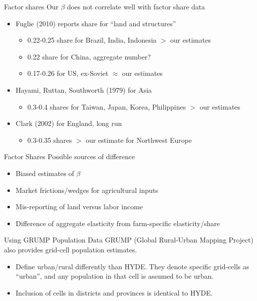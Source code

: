 \documentclass[10pt, xcolor=dvipsnames]{beamer}
\begin{document}
\begin{frame}{Factor shares}\label{shares}
Our $\beta$ does not correlate well with factor share data
\begin{itemize}
  \item Fuglie (2010) reports share for ``land and structures''
  \begin{itemize}
    \item 0.22-0.25 share for Brazil, India, Indonesia $>$ our estimates
    \item 0.22 share for China, aggregate number?
    \item 0.17-0.26 for US, ex-Soviet $\approx$ our estimates
  \end{itemize}
  \item Hayami, Ruttan, Southworth (1979) for Asia
    \begin{itemize}
      \item 0.3-0.4 shares for Taiwan, Japan, Korea, Philippines $>$ our estimates
    \end{itemize}
  \item Clark (2002) for England, long run
    \begin{itemize}
      \item 0.3-0.35 shares $>$ our estimate for Northwest Europe
    \end{itemize}
\end{itemize}
\end{frame}

\begin{frame}{Factor Shares}
Possible sources of difference
\begin{itemize}
  \item Biased estimates of $\beta$
  \item Market frictions/wedges for agricultural inputs
  \item Mis-reporting of land versus labor income
  \item Difference of aggregate elasticity from farm-specific elasticity/share
\end{itemize}

\hfill \hyperlink{robustness}{}
\end{frame}

\begin{frame}{Using GRUMP Population Data}\label{grump}
GRUMP (Global Rural-Urban Mapping Project) also provides grid-cell population estimates. 
\begin{itemize}
  \item Define urban/rural differently than HYDE. They denote specific grid-cells as ``urban'', and any population in that cell is assumed to be urban.
  \item Inclusion of cells in districts and provinces is identical to HYDE. 
\end{itemize}

\end{frame}
\end{document}
